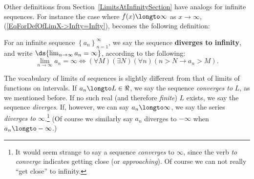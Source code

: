 Other definitions from Section~\ref{LimitsAtInfinitySection}
have analogs for infinite sequences.  
For instance the case where $f(x)\longto\infty$ as $x\to\infty$,
 (\ref{EqForDefOfLimX->Infty=Infty}), becomes the following definition:
\begin{definition}
For an infinite sequence $\left\{a_n\right\}_{n=1}^\infty$,
we say the sequence {\bf diverges to infinity}, and
write $\ds{\lim_{n\to\infty}a_n=\infty}$, according to
the following:
\begin{equation}
\lim_{n\to\infty}a_n=\infty
\iff
(\forall M)(\exists N)(\forall n)(n>N\longrightarrow a_n>M).
\label{DefineLimSequenceToBeInfinity}\end{equation}
\end{definition}
The vocabulary of limits of sequences is slightly different
from that of limits of functions on intervals.  
If $a_n\longto L\in\Re$, we say the
sequence {\it converges to }$L$, as we mentioned before.
If no such real (and therefore {\it finite}) $L$ exists,
we say the sequence {\it diverges}.  If, however, 
we can say $a_n\longto\infty$, we say the series 
{\it diverges to  $\infty$}.\footnote{%
It would seem strange to say a sequence {\it converges} to 
$\infty$, since the verb {\it to converge}
indicates getting close (or {\it approaching}).  
Of course we can not really ``get close'' to infinity.}  
(Of course we similarly say $a_n$ diverges to $-\infty$
when $a_n\longto -\infty$.)


